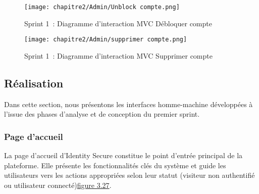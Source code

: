 \begin{figure}[H]
\centering
\texttt{[image: chapitre2/Admin/Unblock compte.png]}
\caption{Sprint 1~: Diagramme d'interaction MVC \og Débloquer compte \fg{}}
\label{fig:3.19}
\end{figure}

\begin{figure}[H]
  \centering
  \texttt{[image: chapitre2/Admin/supprimer compte.png]}
  \caption{Sprint 1~: Diagramme d'interaction MVC \og Supprimer compte \fg{}}
  \label{fig:3.20}
  \end{figure}


\clearpage
\subsection{Réalisation}

Dans cette section, nous présentons les interfaces homme-machine développées à l'issue des phases d'analyse et de conception du premier sprint.
\subsubsection*{Page d'accueil}
La page d'accueil d'Identity Secure constitue le point d'entrée principal de la plateforme. Elle présente les fonctionnalités clés du système et guide les utilisateurs vers les actions appropriées selon leur statut (visiteur non authentifié ou utilisateur connecté)\hyperref[fig:3.27]{figure 3.27}.

